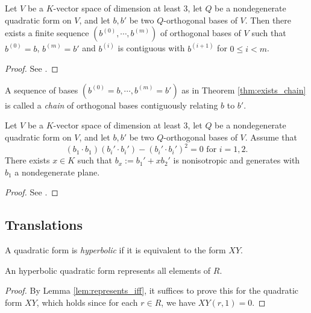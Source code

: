 \begin{theorem}\label{thm:exists_chain}
\leanok
Let $V$ be a $K$-vector space of dimension at least $3$, let $Q$ be a nondegenerate quadratic form on $V$, and let $b, b'$ be two $Q$-orthogonal bases of $V$. Then there exists a finite sequence $(b^{(0)}, \cdots, b^{(m)})$ of orthogonal bases of $V$ such that $b^{(0)} = b$, $b^{(m)} = b'$ and $b^{(i)}$ is contiguous with $b^{(i + 1)}$ for $0 \le i < m$.
\end{theorem}

\begin{proof}
See \cite[\S IV.1.4, Theorem 2]{Ser73}.
\end{proof}

\begin{definition}\label{def:chain}
\leanok
A sequence of bases $(b^{(0)} = b, \cdots, b^{(m)} = b')$ as in Theorem \ref{thm:exists_chain} is called a \emph{chain} of orthogonal bases contiguously relating $b$ to $b'$.
\end{definition}

\begin{lemma}\label{lem:exists_const}
\leanok
Let $V$ be a $K$-vector space of dimension at least $3$, let $Q$ be a nondegenerate quadratic form on $V$, and let $b, b'$ be two $Q$-orthogonal bases of $V$. Assume that
\[ (b_1 \cdot b_1)(b_i' \cdot b_i') - (b_i' \cdot b_i')^2 = 0 \text{ for } i = 1, 2. \]
There exists $x \in K$ such that $b_x := b_1' + x b_2'$ is nonisotropic and generates with $b_1$ a nondegenerate plane.
\end{lemma}

\begin{proof}
	See \cite[\S IV.1.4, Lemma after Theorem 2]{Ser73}.
\end{proof}

\subsection{Translations}\label{subsec:translations}

\begin{definition}\label{def:hyperbolic}
\leanok
A quadratic form is \emph{hyperbolic} if it is equivalent to the form $XY$.
\end{definition}

\begin{lemma}\label{lem:represents_of_hyperbolic}
\leanok
{}
An hyperbolic quadratic form represents all elements of $R$.
\end{lemma}
\begin{proof}
\leanok
{}
By Lemma \ref{lem:represents_iff}, it suffices to prove this for the quadratic form $XY$, which holds since for each $r \in R$, we have $XY(r, 1) = 0$.
\end{proof}


